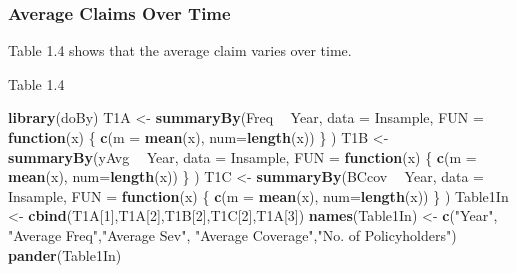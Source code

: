 \documentclass[]{book}
\newenvironment{Shaded}{\begin{snugshade}}{\end{snugshade}}
\newcommand{\KeywordTok}[1]{\textcolor[rgb]{0.13,0.29,0.53}{\textbf{#1}}}
\newcommand{\DataTypeTok}[1]{\textcolor[rgb]{0.13,0.29,0.53}{#1}}
\newcommand{\DecValTok}[1]{\textcolor[rgb]{0.00,0.00,0.81}{#1}}
\newcommand{\StringTok}[1]{\textcolor[rgb]{0.31,0.60,0.02}{#1}}
\newcommand{\ControlFlowTok}[1]{\textcolor[rgb]{0.13,0.29,0.53}{\textbf{#1}}}
\newcommand{\OperatorTok}[1]{\textcolor[rgb]{0.81,0.36,0.00}{\textbf{#1}}}
\newcommand{\NormalTok}[1]{#1}
\theoremstyle{definition}
\theoremstyle{definition}
\theoremstyle{definition}
\theoremstyle{remark}
\begin{document}
\subsubsection{Average Claims Over Time}\label{average-claims-over-time}

Table 1.4 shows that the average claim varies over time.

Table 1.4

\begin{Shaded}
\begin{Highlighting}[]
\KeywordTok{library}\NormalTok{(doBy)}
\NormalTok{T1A <-}\StringTok{ }\KeywordTok{summaryBy}\NormalTok{(Freq }\OperatorTok{~}\StringTok{ }\NormalTok{Year, }\DataTypeTok{data =}\NormalTok{ Insample,   }
                 \DataTypeTok{FUN =} \ControlFlowTok{function}\NormalTok{(x) \{ }\KeywordTok{c}\NormalTok{(}\DataTypeTok{m =} \KeywordTok{mean}\NormalTok{(x), }\DataTypeTok{num=}\KeywordTok{length}\NormalTok{(x)) \} )}
\NormalTok{T1B <-}\StringTok{ }\KeywordTok{summaryBy}\NormalTok{(yAvg    }\OperatorTok{~}\StringTok{ }\NormalTok{Year, }\DataTypeTok{data =}\NormalTok{ Insample,   }
                 \DataTypeTok{FUN =} \ControlFlowTok{function}\NormalTok{(x) \{ }\KeywordTok{c}\NormalTok{(}\DataTypeTok{m =} \KeywordTok{mean}\NormalTok{(x), }\DataTypeTok{num=}\KeywordTok{length}\NormalTok{(x)) \} )}
\NormalTok{T1C <-}\StringTok{ }\KeywordTok{summaryBy}\NormalTok{(BCcov    }\OperatorTok{~}\StringTok{ }\NormalTok{Year, }\DataTypeTok{data =}\NormalTok{ Insample,   }
                 \DataTypeTok{FUN =} \ControlFlowTok{function}\NormalTok{(x) \{ }\KeywordTok{c}\NormalTok{(}\DataTypeTok{m =} \KeywordTok{mean}\NormalTok{(x), }\DataTypeTok{num=}\KeywordTok{length}\NormalTok{(x)) \} )}
\NormalTok{Table1In <-}\StringTok{ }\KeywordTok{cbind}\NormalTok{(T1A[}\DecValTok{1}\NormalTok{],T1A[}\DecValTok{2}\NormalTok{],T1B[}\DecValTok{2}\NormalTok{],T1C[}\DecValTok{2}\NormalTok{],T1A[}\DecValTok{3}\NormalTok{])}
\KeywordTok{names}\NormalTok{(Table1In) <-}\StringTok{ }\KeywordTok{c}\NormalTok{(}\StringTok{"Year"}\NormalTok{, }\StringTok{"Average Freq"}\NormalTok{,}\StringTok{"Average Sev"}\NormalTok{, }\StringTok{"Average Coverage"}\NormalTok{,}\StringTok{"No. of Policyholders"}\NormalTok{)}
\KeywordTok{pander}\NormalTok{(Table1In)}
\end{Highlighting}
\end{Shaded}
\end{document}
